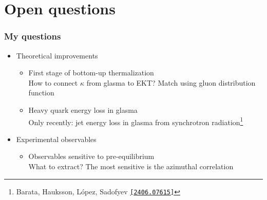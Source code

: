 \documentclass[aspectratio=169,11pt,usenames,dvipsnames]{beamer}
\begin{document}

\section{Open questions}


\begin{frame}
    \frametitle{My questions}
        \begin{itemize}
            \item  {\large{Theoretical improvements}}
                \begin{itemize}
                    \item[\raisebox{0.2em}{\scalebox{0.6}{${\color{ming}\blacktriangleright}$}}] First stage of bottom-up thermalization\\
                    {\scriptsize\color{lightgray}How to connect $\kappa$ from glasma to EKT? Match using gluon distribution function} \\[5pt]
                    \item[\raisebox{0.2em}{\scalebox{0.6}{${\color{ming}\blacktriangleright}$}}] Heavy quark energy loss in glasma \\
                    {\scriptsize\color{lightgray}Only recently: jet energy loss in glasma from synchrotron radiation\footnote{\scriptsize Barata, Hauksson, López, Sadofyev \href{https://arxiv.org/abs/2406.07615}{{\color{customblue}\texttt{[2406.07615]}}}}}
                \end{itemize}
                \item  {\large{Experimental observables}}
                \begin{itemize}
                    \item[\raisebox{0.2em}{\scalebox{0.6}{${\color{pinky}\blacktriangleright}$}}] Observables sensitive to pre-equilibrium\\
                    {\scriptsize\color{lightgray}What to extract? The most sensitive is the azimuthal correlation} \\[5pt]

\end{itemize}
\end{itemize}
\end{frame}
\end{document}
